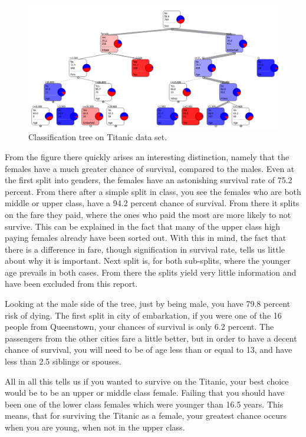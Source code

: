 \documentclass[a4paper,11pt]{article}
\begin{document}
\begin{figure}[h]
\begin{center}
\includegraphics[scale=0.5]{ClassificationTree}
\end{center}
\caption{Classification tree on Titanic data set.}
\label{classificationTree}
\end{figure}

From the figure there quickly arises an interesting distinction, namely that the females have a much greater chance of survival, compared to the males. Even at the first split into genders, the females have an astonishing survival rate of 75.2 percent. From there after a simple split in class, you see the females who are both middle or upper class, have a 94.2 percent chance of survival. From there it splits on the fare they paid, where the ones who paid the most are more likely to not survive. This can be explained in the fact that many of the upper class high paying females already have been sorted out. With this in mind, the fact that there is a difference in fare, though signification in survival rate, tells us little about why it is important. Next split is, for both sub-splits, where the younger age prevails in both cases. From there the splits yield very little information and have been excluded from this report.

Looking at the male side of the tree, just by being male, you have 79.8 percent risk of dying. The first split in city of embarkation, if you were one of the 16 people from Queenstown, your chances of survival is only 6.2 percent. The passengers from the other cities fare a little better, but in order to have a decent chance of survival, you will need to be of age less than or equal to 13, and have less than 2.5 siblings or spouses.

All in all this tells us if you wanted to survive on the Titanic, your best choice would be to be an upper or middle class female. Failing that you should have been one of the lower class females which were younger than 16.5 years. This means, that for surviving the Titanic as a female, your greatest chance occurs when you are young, when not in the upper class. 
\end{document}
